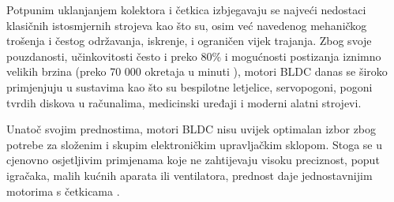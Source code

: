 \documentclass[diplomskirad]{fer}
\begin{document}
Potpunim uklanjanjem kolektora i četkica izbjegavaju se najveći nedostaci
klasičnih istosmjernih strojeva kao što su, osim već navedenog mehaničkog
trošenja i čestog održavanja, iskrenje, i ograničen vijek trajanja. Zbog svoje
pouzdanosti, učinkovitosti često i preko 80\% \cite{motor-ucinkovitost} i
mogućnosti postizanja iznimno velikih brzina (preko 70 000 okretaja u minuti
\cite{motor-rpm}), motori BLDC danas se široko primjenjuju u sustavima kao što
su bespilotne letjelice, servopogoni, pogoni tvrdih diskova u računalima,
medicinski uređaji i moderni alatni strojevi.

Unatoč svojim prednostima, motori BLDC nisu uvijek optimalan izbor zbog potrebe
za složenim i skupim elektroničkim upravljačkim sklopom. Stoga se u cjenovno
osjetljivim primjenama koje ne zahtijevaju visoku preciznost, poput igračaka,
malih kućnih aparata ili ventilatora, prednost daje jednostavnijim motorima s
četkicama \cite{HughesDrury2013}.

\newpage
\end{document}

